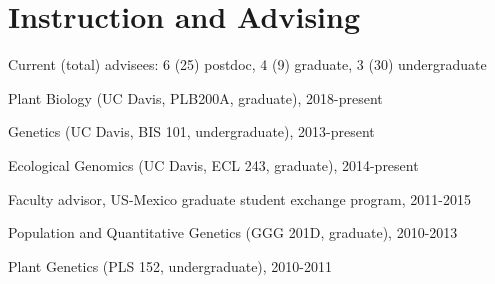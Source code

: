 \documentclass[letterpaper,10pt]{article}
\renewenvironment{itemize}{
  \begin{list}{}{
    \setlength{\leftmargin}{1.5em}
  }
}{
  \end{list}
}
\begin{document}
\section*{Instruction and Advising}
\begin{itemize}
\setlength\itemsep{0ex}
\item Current (total) advisees: 6 (25) postdoc, 4 (9) graduate, 3 (30) undergraduate

%


\item Plant Biology (UC Davis, PLB200A, graduate), 2018-present
\item Genetics (UC Davis, BIS 101, undergraduate), 2013-present
\item Ecological Genomics (UC Davis, ECL  243, graduate), 2014-present
\item Faculty advisor, US-Mexico graduate student exchange program, 2011-2015
\item Population and Quantitative Genetics (GGG 201D, graduate), 2010-2013 %
\item Plant Genetics (PLS 152, undergraduate), 2010-2011 %

\end{itemize}
\end{document}
